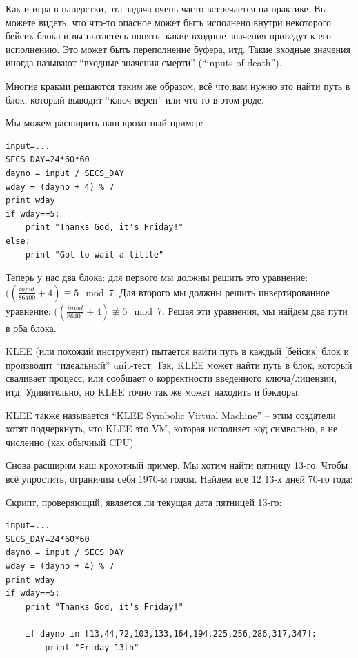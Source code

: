 Как и игра в наперстки, эта задача очень часто встречается на практике.
Вы можете видеть, что что-то опасное может быть исполнено внутри некоторого бейсик-блока и вы пытаетесь понять,
какие входные значения приведут к его исполнению.
Это может быть переполнение буфера, итд.
Такие входные значения иногда называют ``входные значения смерти'' (``inputs of death'').

Многие кракми решаются таким же образом, всё что вам нужно это найти путь в блок, который выводит ``ключ верен''
или что-то в этом роде.

Мы можем расширить наш крохотный пример:

\begin{lstlisting}
input=...
SECS_DAY=24*60*60
dayno = input / SECS_DAY
wday = (dayno + 4) % 7
print wday
if wday==5:
    print "Thanks God, it's Friday!"
else:
    print "Got to wait a little"
\end{lstlisting}

Теперь у нас два блока: для первого мы должны решить это уравнение: $((\frac{input}{86400}+4) \equiv 5 \mod 7$.
Для второго мы должны решить инвертированное уравнение: $((\frac{input}{86400}+4) \not\equiv 5 \mod 7$.
Решая эти уравнения, мы найдем два пути в оба блока.

KLEE (или похожий инструмент) пытается найти путь в каждый [бейсик] блок и производит ``идеальный'' unit-тест.
Так, KLEE может найти путь в блок, который сваливает процесс, или сообщает о корректности введенного ключа/лицензии, итд.
Удивительно, но KLEE точно так же может находить и бэкдоры.

KLEE также называется ``KLEE Symbolic Virtual Machine'' -- этим создатели хотят подчеркнуть, что KLEE это \ac{VM},
которая исполняет код символьно, а не численно (как обычный \ac{CPU}).

Снова расширим наш крохотный пример.
Мы хотим найти пятницу 13-го. Чтобы всё упростить, ограничим себя 1970-м годом.
Найдем все 12 13-х дней 70-го года:



Скрипт, проверяющий, является ли текущая дата пятницей 13-го:

\begin{lstlisting}
input=...
SECS_DAY=24*60*60
dayno = input / SECS_DAY
wday = (dayno + 4) % 7
print wday
if wday==5:
    print "Thanks God, it's Friday!"
 
    if dayno in [13,44,72,103,133,164,194,225,256,286,317,347]:
        print "Friday 13th"
\end{lstlisting}

